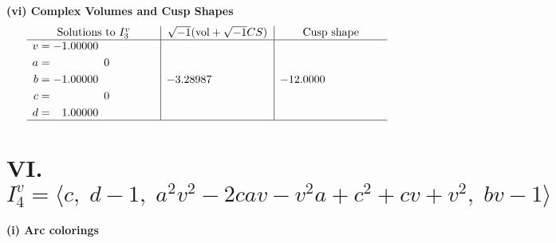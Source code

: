 \documentclass[1p]{elsarticle_modified}
\theoremstyle{definition}
\newcommand{\I}{\sqrt{-1}}
\begin{document}
\newpage\flushleft \textbf{(vi) Complex Volumes and Cusp Shapes}
$$\begin{array}{c|c|c}  
\text{Solutions to }I^v_{3}& \I (\text{vol} + \sqrt{-1}CS) & \text{Cusp shape}\\
 \hline 
\begin{aligned}
v &= -1.00000\phantom{ +0.000000I} \\
a &= \phantom{-0.000000 } 0 \\
b &= -1.00000\phantom{ +0.000000I} \\
c &= \phantom{-0.000000 } 0 \\
d &= \phantom{-}1.00000\phantom{ +0.000000I}\end{aligned}
 & -3.28987\phantom{ +0.000000I} & -12.0000\phantom{ +0.000000I}\\
 \hline 
 \end{array}$$\newpage\newpage\renewcommand{\arraystretch}{1}
\centering \section*{VI. $I^v_{4}= \langle c,\;d-1,\;a^2 v^2-2 c a v- v^2 a+c^2+c v+v^2,\;b v-1 \rangle$}
\flushleft \textbf{(i) Arc colorings}\\
\end{document}

